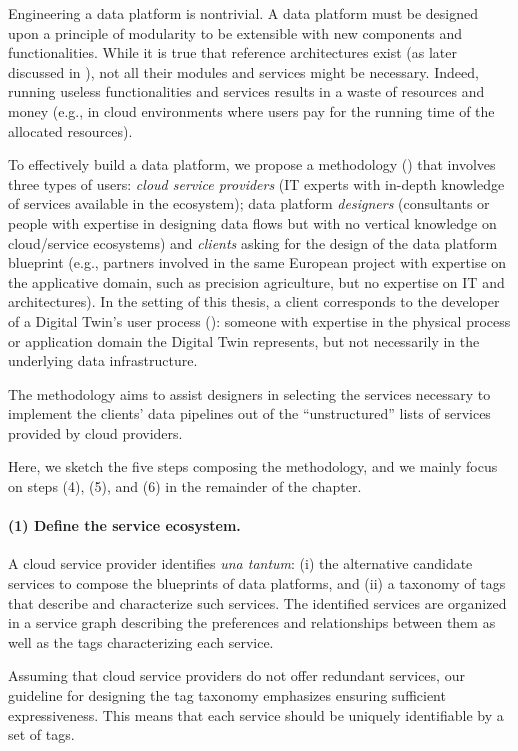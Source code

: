 Engineering a data platform is nontrivial. A data platform must be designed upon a principle of modularity to be extensible with new components and functionalities. While it is true that reference architectures exist (as later discussed in ), not all their modules and services might be necessary. Indeed, running useless functionalities and services results in a waste of resources and money (e.g., in cloud environments where users pay for the running time of the allocated resources).

To effectively build a data platform, we propose a methodology () that involves three types of users: \emph{cloud service providers} (IT experts with in-depth knowledge of services available in the ecosystem); data platform \emph{designers} (consultants or people with expertise in designing data flows but with no vertical knowledge on cloud/service ecosystems) and \emph{clients} asking for the design of the data platform blueprint (e.g., partners involved in the same European project with expertise on the applicative domain, such as precision agriculture, but no expertise on IT and architectures). {\color{red}In the setting of this thesis, a client corresponds to the developer of a Digital Twin's user process (): someone with expertise in the physical process or application domain the Digital Twin represents, but not necessarily in the underlying data infrastructure.}

The methodology aims to assist designers in selecting the services necessary to implement the clients' data pipelines out of the ``unstructured'' lists of services provided by cloud providers.

Here, we sketch the five steps composing the methodology, and we mainly focus on steps (4), (5), and (6) in the remainder of the chapter.

\paragraph{(1) Define the service ecosystem.}
A cloud service provider identifies \textit{una tantum}: (i) the alternative candidate services to compose the blueprints of data platforms, and (ii) a taxonomy of tags that describe and characterize such services. The identified services are organized in a service graph describing the preferences and relationships between them as well as the tags characterizing each service.

Assuming that cloud service providers do not offer redundant services, our guideline for designing the tag taxonomy emphasizes ensuring sufficient expressiveness. This means that each service should be uniquely identifiable by a set of tags.

